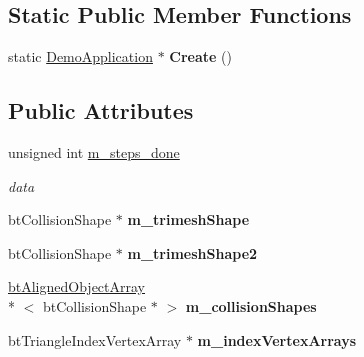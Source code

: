 \subsection*{Static Public Member Functions}
\begin{DoxyCompactItemize}
\item 
\hypertarget{class_gimpact_concave_demo_aee9c3a9a6550d4cd9b5bdf30c59e596e}{static \hyperlink{class_demo_application}{Demo\+Application} $\ast$ {\bfseries Create} ()}\label{class_gimpact_concave_demo_aee9c3a9a6550d4cd9b5bdf30c59e596e}

\end{DoxyCompactItemize}
\subsection*{Public Attributes}
\begin{DoxyCompactItemize}
\item 
\hypertarget{class_gimpact_concave_demo_a33a4cd8e026d5d4ffc8352e0ae803663}{unsigned int \hyperlink{class_gimpact_concave_demo_a33a4cd8e026d5d4ffc8352e0ae803663}{m\+\_\+steps\+\_\+done}}\label{class_gimpact_concave_demo_a33a4cd8e026d5d4ffc8352e0ae803663}

\begin{DoxyCompactList}\small\item\em data \end{DoxyCompactList}\item 
\hypertarget{class_gimpact_concave_demo_a99a9bbe244f417cb956461d14b68c2fb}{bt\+Collision\+Shape $\ast$ {\bfseries m\+\_\+trimesh\+Shape}}\label{class_gimpact_concave_demo_a99a9bbe244f417cb956461d14b68c2fb}

\item 
\hypertarget{class_gimpact_concave_demo_a9d9b90e4602dc430edd1bd8123f147df}{bt\+Collision\+Shape $\ast$ {\bfseries m\+\_\+trimesh\+Shape2}}\label{class_gimpact_concave_demo_a9d9b90e4602dc430edd1bd8123f147df}

\item 
\hypertarget{class_gimpact_concave_demo_ac8eaf573c677975ed3be9659b9057430}{\hyperlink{classbt_aligned_object_array}{bt\+Aligned\+Object\+Array}\\*
$<$ bt\+Collision\+Shape $\ast$ $>$ {\bfseries m\+\_\+collision\+Shapes}}\label{class_gimpact_concave_demo_ac8eaf573c677975ed3be9659b9057430}

\item 
\hypertarget{class_gimpact_concave_demo_a1239ff457340e759bb16050cbf83f17a}{bt\+Triangle\+Index\+Vertex\+Array $\ast$ {\bfseries m\+\_\+index\+Vertex\+Arrays}}\label{class_gimpact_concave_demo_a1239ff457340e759bb16050cbf83f17a}


\end{DoxyCompactItemize}
